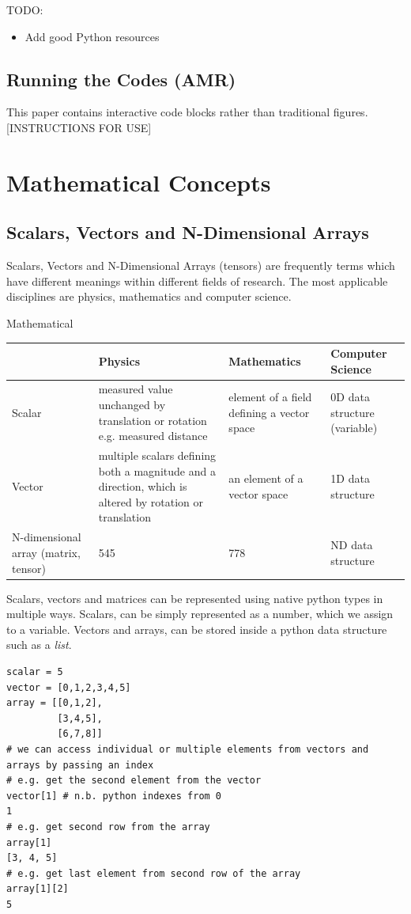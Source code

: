 \documentclass[%
 superscriptaddress,
 aip,
 amsmath,amssymb,
preprint,%
 author-year,%
longbibliography
]{revtex4-2}
\begin{document}
TODO:
\begin{itemize}
    \item Add good Python resources
\end{itemize}


\subsection*{Running the Codes (AMR)}

This paper contains interactive code blocks rather than traditional figures. [INSTRUCTIONS FOR USE]


\section*{Mathematical Concepts}\label{math_stuff}

\subsection*{Scalars, Vectors and N-Dimensional Arrays}

Scalars, Vectors and N-Dimensional Arrays (tensors) are frequently terms which have different meanings within different fields of research. The most applicable disciplines are physics, mathematics and computer science.  


Mathematical 

\begin{center}
\begin{tabular}{|| m{3cm} | m{4cm}| m{4cm} | m{4cm}||} 
 \hline
  & Physics & Mathematics & Computer Science \\ [0.5ex] 
 \hline\hline
 Scalar & measured value unchanged by translation or rotation e.g. measured distance & element of a field defining a vector space & 0D data structure (variable) \\ 
 \hline
 Vector & multiple scalars defining both a magnitude and a direction, which is altered by rotation or translation & an element of a vector space & 1D data structure \\
 \hline
 N-dimensional array (matrix, tensor) & 545 & 778 & ND data structure \\
 \hline
\end{tabular}
\end{center}
\break

Scalars, vectors and matrices can be represented using native python types in multiple ways. Scalars, can be simply represented as a number, which we assign to a variable. Vectors and arrays, can be stored inside a python data structure such as a \emph{list}.
\break
\begin{lstlisting}[caption= Examples of a scalar vector and a 2D array in Python syntax]
scalar = 5
vector = [0,1,2,3,4,5]
array = [[0,1,2],
         [3,4,5],
         [6,7,8]]
# we can access individual or multiple elements from vectors and arrays by passing an index 
# e.g. get the second element from the vector 
vector[1] # n.b. python indexes from 0
1
# e.g. get second row from the array
array[1]
[3, 4, 5]
# e.g. get last element from second row of the array
array[1][2]
5
\end{lstlisting}
\end{document}
